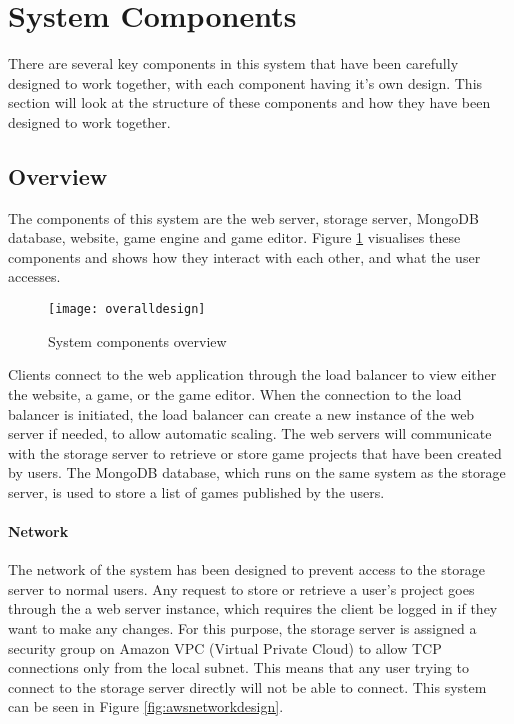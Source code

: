 
\section{System Components}
There are several key components in this system that have been carefully designed to work together, with each component having it's own design. This section will look at the structure of these components and how they have been designed to work together.

	\subsection{Overview}
	The components of this system are the web server, storage server, MongoDB database, website, game engine and game editor. Figure \ref{fig:overalldesign} visualises these components and shows how they interact with each other, and what the user accesses.

	\begin{figure}[h]
		\centering
		\texttt{[image: overalldesign]}
		\caption{System components overview}
		\label{fig:overalldesign}
	\end{figure}

	Clients connect to the web application through the load balancer to view either the website, a game, or the game editor. When the connection to the load balancer is initiated, the load balancer can create a new instance of the web server if needed, to allow automatic scaling. The web servers will communicate with the storage server to retrieve or store game projects that have been created by users. The MongoDB database, which runs on the same system as the storage server, is used to store a list of games published by the users.

	\paragraph{Network}
	The network of the system has been designed to prevent access to the storage server to normal users. Any request to store or retrieve a user's project goes through the a web server instance, which requires the client be logged in if they want to make any changes. For this purpose, the storage server is assigned a security group on Amazon VPC (Virtual Private Cloud) to allow TCP connections only from the local subnet. This means that any user trying to connect to the storage server directly will not be able to connect. This system can be seen in Figure \ref{fig:awsnetworkdesign}.

